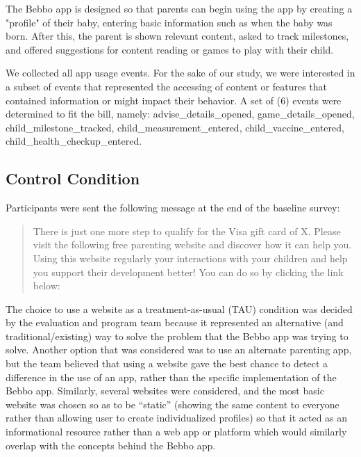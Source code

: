 \documentclass{article}
\begin{document}
The Bebbo app is designed so that parents can begin using the app by creating a "profile" of their baby, entering basic information such as when the baby was born. After this, the parent is shown relevant content, asked to track milestones, and offered suggestions for content reading or games to play with their child.

We collected all app usage events. For the sake of our study, we were interested in a subset of events that represented the accessing of content or features that contained information or might impact their behavior. A set of (6) events were determined to fit the bill, namely: advise\_details\_opened, game\_details\_opened, child\_milestone\_tracked, child\_measurement\_entered, child\_vaccine\_entered, child\_health\_checkup\_entered.


\subsection*{Control Condition}

Participants were sent the following message at the end of the baseline survey:

\begin{quote}

There is just one more step to qualify for the Visa gift card of X. Please visit the following free parenting website and discover how it can help you. Using this website regularly  your interactions with your children and help you support their development better! You can do so by clicking the link below:
\end{quote}

The choice to use a website as a treatment-as-usual (TAU) condition was decided by the evaluation and program team because it represented an alternative (and traditional/existing) way to solve the problem that the Bebbo app was trying to solve. Another option that was considered was to use an alternate parenting app, but the team believed that using a website gave the best chance to detect a difference in the use of an app, rather than the specific implementation of the Bebbo app. Similarly, several websites were considered, and the most basic website was chosen so as to be ``static'' (showing the same content to everyone rather than allowing user to create individualized profiles) so that it acted as an informational resource rather than a web app or platform which would similarly overlap with the concepts behind the Bebbo app.
\end{document}
